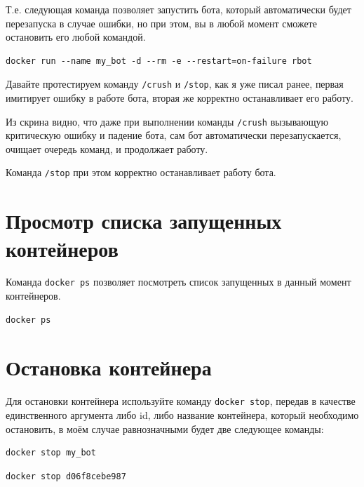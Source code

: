 \documentclass[
]{book}
\begin{document}
Т.е. следующая команда позволяет запустить бота, который автоматически будет перезапуска в случае ошибки, но при этом, вы в любой момент сможете остановить его любой командой.

\begin{verbatim}
docker run --name my_bot -d --rm -e --restart=on-failure rbot
\end{verbatim}

Давайте протестируем команду \texttt{/crush} и \texttt{/stop}, как я уже писал ранее, первая имитирует ошибку в работе бота, вторая же корректно останавливает его работу.

Из скрина видно, что даже при выполнении команды \texttt{/crush} вызывающую критическую ошибку и падение бота, сам бот автоматически перезапускается, очищает очередь команд, и продолжает работу.

Команда \texttt{/stop} при этом корректно останавливает работу бота.

\section{Просмотр списка запущенных контейнеров}\label{ux43fux440ux43eux441ux43cux43eux442ux440-ux441ux43fux438ux441ux43aux430-ux437ux430ux43fux443ux449ux435ux43dux43dux44bux445-ux43aux43eux43dux442ux435ux439ux43dux435ux440ux43eux432}

Команда \texttt{docker\ ps} позволяет посмотреть список запущенных в данный момент контейнеров.

\begin{verbatim}
docker ps
\end{verbatim}

\section{Остановка контейнера}\label{ux43eux441ux442ux430ux43dux43eux432ux43aux430-ux43aux43eux43dux442ux435ux439ux43dux435ux440ux430}

Для остановки контейнера используйте команду \texttt{docker\ stop}, передав в качестве единственного аргумента либо id, либо название контейнера, который необходимо остановить, в моём случае равнозначными будет две следующее команды:

\begin{verbatim}
docker stop my_bot
\end{verbatim}

\begin{verbatim}
docker stop d06f8cebe987
\end{verbatim}
\end{document}
